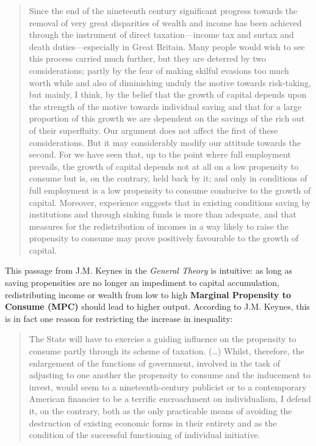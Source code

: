 \documentclass[]{book}
\theoremstyle{definition}
\theoremstyle{definition}
\theoremstyle{definition}
\theoremstyle{remark}
\begin{document}
\begin{quote}
Since the end of the nineteenth century significant progress towards the
removal of very great disparities of wealth and income has been achieved
through the instrument of direct taxation---income tax and surtax and
death duties---especially in Great Britain. Many people would wish to
see this process carried much further, but they are deterred by two
considerations; partly by the fear of making skilful evasions too much
worth while and also of diminishing unduly the motive towards
risk-taking, but mainly, I think, by the belief that the growth of
capital depends upon the strength of the motive towards individual
saving and that for a large proportion of this growth we are dependent
on the savings of the rich out of their superfluity. Our argument does
not affect the first of these considerations. But it may considerably
modify our attitude towards the second. For we have seen that, up to the
point where full employment prevails, the growth of capital depends not
at all on a low propensity to consume but is, on the contrary, held back
by it; and only in conditions of full employment is a low propensity to
consume conducive to the growth of capital. Moreover, experience
suggests that in existing conditions saving by institutions and through
sinking funds is more than adequate, and that measures for the
redistribution of incomes in a way likely to raise the propensity to
consume may prove positively favourable to the growth of capital.
\end{quote}

This passage from J.M. Keynes in the \emph{General Theory} is intuitive:
as long as saving propensities are no longer an impediment to capital
accumulation, redistributing income or wealth from low to high
\textbf{Marginal Propensity to Consume (MPC)} should lead to higher
output. According to J.M. Keynes, this is in fact one reason for
restricting the increase in inequality:

\begin{quote}
The State will have to exercise a guiding influence on the propensity to
consume partly through its scheme of taxation. (\ldots{}) Whilst,
therefore, the enlargement of the functions of government, involved in
the task of adjusting to one another the propensity to consume and the
inducement to invest, would seem to a nineteenth-century publicist or to
a contemporary American financier to be a terrific encroachment on
individualism, I defend it, on the contrary, both as the only
practicable means of avoiding the destruction of existing economic forms
in their entirety and as the condition of the successful functioning of
individual initiative.
\end{quote}
\end{document}
